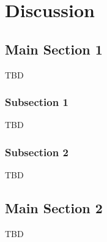 
\chapter{Discussion} %
\label{chap:discussion}



\section{Main Section 1}

TBD

\subsection{Subsection 1}

TBD


\subsection{Subsection 2}

TBD



\section{Main Section 2}

TBD